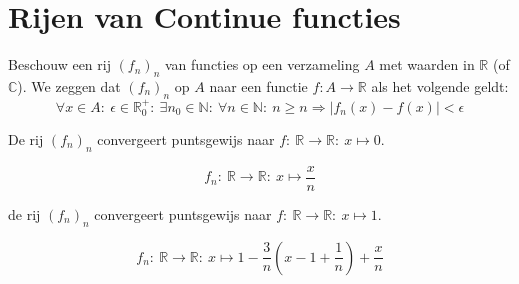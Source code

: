 \documentclass[main.tex]{subfiles}
\begin{document}
\section{Rijen van Continue functies}
\label{sec:rijen-van-Continue-functies}

\begin{de}
  Beschouw een rij $(f_{n})_{n}$ van functies op een verzameling $A$ met waarden in $\mathbb{R}$ (of $\mathbb{C}$).
  We zeggen dat $(f_{n})_{n}$  op $A$ naar een functie $f: A \rightarrow \mathbb{R}$ als het volgende geldt:
  \[ \forall x\in A:\ \epsilon \in \mathbb{R}_{0}^{+}:\ \exists n_{0}\in \mathbb{N}:\ \forall n\in \mathbb{N}:\ n \ge n \Rightarrow |f_{n}(x)-f(x)| < \epsilon \]
\end{de}

\begin{vb}
  De rij $(f_{n})_{n}$ convergeert puntsgewijs naar $f:\ \mathbb{R} \rightarrow \mathbb{R}:\ x \mapsto 0$.

  \noindent
  \begin{minipage}{.45\textwidth}
    \begin{figure}[H]
      \centering
    \end{figure}
  \end{minipage}
  \begin{minipage}{.45\textwidth}
    \[ f_{n}:\ \mathbb{R} \rightarrow \mathbb{R}:\ x \mapsto \frac{x}{n} \]
  \end{minipage}
\end{vb}

\begin{vb}
  de rij $(f_{n})_{n}$ convergeert puntsgewijs naar $f:\ \mathbb{R} \rightarrow \mathbb{R}:\ x \mapsto 1$.

  \noindent
  \begin{minipage}{.45\textwidth}
    \begin{figure}[H]
      \centering
    \end{figure}
  \end{minipage}
  \begin{minipage}{.45\textwidth}
  \[ f_{n}:\ \mathbb{R} \rightarrow \mathbb{R}:\ x \mapsto 1- \frac{3}{n}\left(x-1+\frac{1}{n}\right) + \frac{x}{n} \]
  \end{minipage}
\end{vb}
\end{document}
